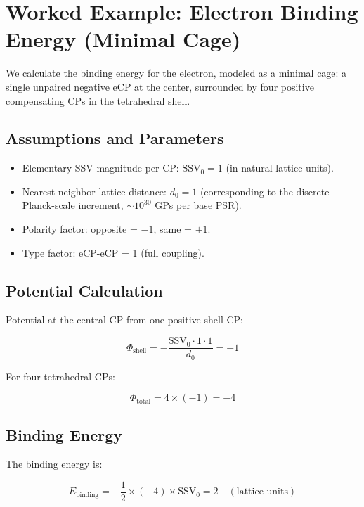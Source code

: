 \documentclass[11pt]{article}
\begin{document}
\section{Worked Example: Electron Binding Energy (Minimal Cage)}

We calculate the binding energy for the electron, modeled as a minimal cage: a single unpaired negative eCP at the center, surrounded by four positive compensating CPs in the tetrahedral shell.

\subsection{Assumptions and Parameters}
\begin{itemize}
    \item Elementary SSV magnitude per CP: $\text{SSV}_0 = 1$ (in natural lattice units).
    \item Nearest-neighbor lattice distance: $d_0 = 1$ (corresponding to the discrete Planck-scale increment, $\sim 10^{30}$ GPs per base PSR).
    \item Polarity factor: opposite = $-1$, same = $+1$.
    \item Type factor: eCP-eCP = 1 (full coupling).
\end{itemize}

\subsection{Potential Calculation}
Potential at the central CP from one positive shell CP:

\begin{equation}
\Phi_{\text{shell}} = - \frac{\text{SSV}_0 \cdot 1 \cdot 1}{d_0} = -1
\end{equation}

For four tetrahedral CPs:

\begin{equation}
\Phi_{\text{total}} = 4 \times (-1) = -4
\end{equation}

\subsection{Binding Energy}
The binding energy is:

\begin{equation}
E_{\text{binding}} = -\frac{1}{2} \times (-4) \times \text{SSV}_0 = 2 \quad (\text{lattice units})
\label{eq:electron_binding_lattice}
\end{equation}
\end{document}
